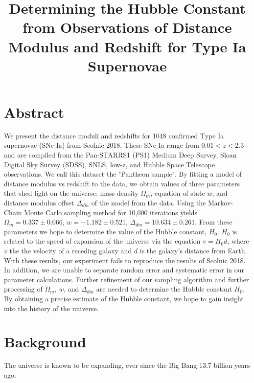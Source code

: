 \documentclass[twocolumn]{aastex63}
\begin{document}
\title{Determining the Hubble Constant from Observations of Distance Modulus and
Redshift for Type Ia Supernovae}

\section{Abstract}

We present the distance moduli and redshifts for 1048 confirmed Type Ia
supernovae (SNe Ia) from Scolnic 2018. These SNe Ia range from
$0.01 < z < 2.3$ and are compiled from the Pan-STARRS1 (PS1) Medium Deep Survey,
Sloan Digital Sky Survey (SDSS), SNLS, low-z, and Hubble Space Telescope
observations. We call this dataset the "Pantheon sample". By fitting a model of
distance modulus vs redshift to the data, we obtain values of three parameters
that shed light on the universe: mass density $\Omega_m$, equation of state $w$,
and distance modulus offset $\Delta_{dm}$ of the model from the data. Using the
Markov-Chain Monte Carlo sampling method for 10,000 iterations yields
$\Omega_m=0.337\pm0.066$, $w=-1.182\pm0.521$, $\Delta_{dm}=10.634\pm0.261$.
From these parameters we hope to determine the
value of the Hubble constant, $H_0$. $H_0$ is related to the speed of expansion
of the universe via the equation $v = H_0 d$, where $v$ the the velocity of a
receding galaxy and $d$ is the galaxy's distance from Earth. With these results,
our experiment fails to reproduce the results of Scolnic 2018.
In addition, we are unable to separate random error
and systematic error in our parameter calculations.
Further refinement of our sampling algorithm and further processing of
$\Omega_m$, $w$, and $\Delta_{dm}$ are needed to determine the Hubble constant
$H_0$. By obtaining a precise estimate of the Hubble constant, we
hope to gain insight into the history of the universe.

\section{Background}
The universe is known to be expanding, ever since the Big Bang 13.7 billion
years ago.
\end{document}
